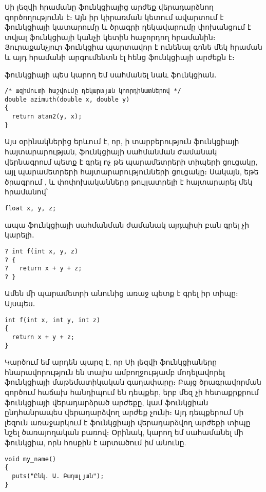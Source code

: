 Սի լեզվի  հրամանը ֆունկցիայից արժեք
վերադարձնող գործողությունն է։ Այն իր կիրառման կետում ավարտում է
ֆունկցիայի կատարումը և ծրագրի ղեկավարումը փոխանցում է տվյալ ֆունկցիայի
կանչի կետին հաջորդող հրամանին։ Յուրաքանչյուր ֆունկցիա պարտավոր է ունենալ
գոնե մեկ  հրաման և այդ հրամանի արգումենտն էլ հենց
ֆունկցիայի արժեքն է։

 ֆունկցիայի պես կարող եմ սահմանել նաև 
ֆունկցիան․

\begin{Verbatim}
/* ազիմուտի հաշվումը դեկարտյան կոորդինատներով */
double azimuth(double x, double y)
{
  return atan2(y, x);
}
\end{Verbatim}

Այս օրինակներից երևում է, որ, ի տարբերություն ֆունկցիայի հայտարարության,
ֆունկցիայի սահմանման ժամանակ վերնագրում պետք է գրել ոչ թե պարամետրերի տիպերի
ցուցակը, այլ պարամետրերի հայտարարությունների ցուցակը։ Սակայն, եթե ծրագրում
,  և  փոփոխականները թույլատրելի է հայտարարել
մեկ հրամանով՝

\begin{Verbatim}
float x, y, z;
\end{Verbatim}

ապա ֆունկցիայի սահմանման ժամանակ այդպիսի բան գրել չի կարելի․

\begin{Verbatim}
? int f(int x, y, z)
? {
?   return x + y + z;
? }
\end{Verbatim}

Ամեն մի պարամետրի անունից առաջ պետք է գրել իր տիպը։ Այսպես․

\begin{Verbatim}
int f(int x, int y, int z)
{
  return x + y + z;
}
\end{Verbatim}

Կարծում եմ արդեն պարզ է, որ Սի լեզվի ֆունկցիաները հնարավորություն են տալիս
ամբողջությամբ մոդելավորել ֆունկցիայի մաթեմատիկական գաղափարը։ Բայց ծրագրավորման
գործում հաճախ հանդիպում են դեպքեր, երբ մեզ չի հետաքրքրում ֆունկցիայի
վերադարձրած արժեքը, կամ ֆունկցիան ընդհանրապես վերադարձվող արժեք չունի։ Այդ
դեպքերում Սի լեզուն առաջարկում է ֆունկցիայի վերադարձվող արժեքի տիպը նշել
 ծառայողական բառով։ Օրինակ, կարող եմ սահամանել մի
ֆունկցիա, որն  հոսքին է արտածում իմ անունը.

\begin{Verbatim}
void my_name()
{
  puts("Ընկ. Ա. Բադալյան");
}
\end{Verbatim}

